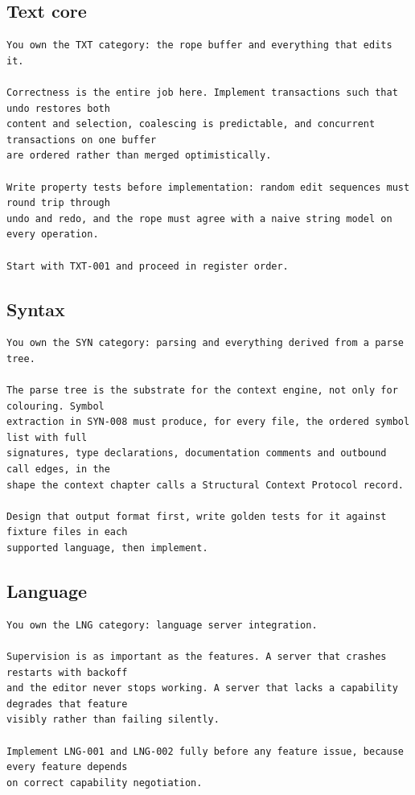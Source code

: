 \subsection{Text core}
\begin{lstlisting}
You own the TXT category: the rope buffer and everything that edits it.

Correctness is the entire job here. Implement transactions such that undo restores both
content and selection, coalescing is predictable, and concurrent transactions on one buffer
are ordered rather than merged optimistically.

Write property tests before implementation: random edit sequences must round trip through
undo and redo, and the rope must agree with a naive string model on every operation.

Start with TXT-001 and proceed in register order.
\end{lstlisting}

\subsection{Syntax}
\begin{lstlisting}
You own the SYN category: parsing and everything derived from a parse tree.

The parse tree is the substrate for the context engine, not only for colouring. Symbol
extraction in SYN-008 must produce, for every file, the ordered symbol list with full
signatures, type declarations, documentation comments and outbound call edges, in the
shape the context chapter calls a Structural Context Protocol record.

Design that output format first, write golden tests for it against fixture files in each
supported language, then implement.
\end{lstlisting}

\subsection{Language}
\begin{lstlisting}
You own the LNG category: language server integration.

Supervision is as important as the features. A server that crashes restarts with backoff
and the editor never stops working. A server that lacks a capability degrades that feature
visibly rather than failing silently.

Implement LNG-001 and LNG-002 fully before any feature issue, because every feature depends
on correct capability negotiation.
\end{lstlisting}

